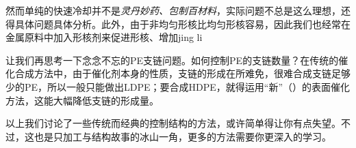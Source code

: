 然而单纯的快速冷却并不是\textsl{灵丹妙药、包制百材料}，实际问题不总是这么理想，还得具体问题具体分析。此外，由于非均匀形核比均匀形核容易，因此我们也经常在金属原料中加入形核剂来促进形核、增加jing li


让我们再思考一下念念不忘的PE支链问题。如何控制PE的支链数量？在传统的催化合成方法中，由于催化剂本身的性质，支链的形成在所难免，很难合成支链足够少的PE，所以一般只能做出LDPE；要合成HDPE，就得运用“新”（）的表面催化方法，这能大幅降低支链的形成量。

以上我们讨论了一些传统而经典的控制结构的方法，或许简单得让你有点失望。不过，这也是只加工与结构故事的冰山一角，更多的方法需要你更深入的学习。


